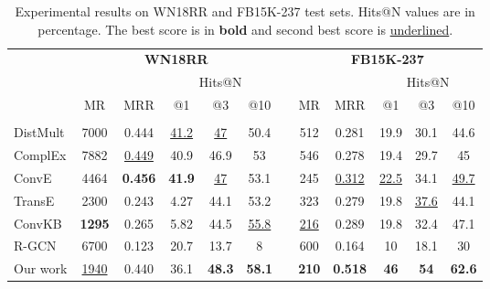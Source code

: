 \documentclass[11pt,a4paper]{article}
\begin{document}
\begin{table*}[t!]
	\centering\small
	\setlength{\tabcolsep}{4pt} \renewcommand{\arraystretch}{1} \begin{tabular}{lccccclccccc}
		\hline
		& \multicolumn{5}{c}{\textbf{WN18RR}} &  & \multicolumn{5}{c}{\textbf{FB15K-237}}         \\ \cline{2-6} \cline{8-12} 
		
		&  &  & \multicolumn{3}{c}{Hits@N} &  &  &  & \multicolumn{3}{c}{Hits@N} \\ \cline{4-6} \cline{10-12} 
		
		& MR & MRR & @1 & @3 & @10 &    & MR & MRR & @1 & @3 & @10    \\
		\hline
		\\
		DistMult \cite{yang2014} & 7000 & 0.444 & \underline{41.2} & \underline{47} & 50.4 &    & 512 & 0.281 & 19.9 & 30.1 & 44.6  \\
		
		ComplEx \cite{trouillon2016complex} & 7882 & \underline{0.449} & 40.9 & 46.9 & 53 &    & 546 & 0.278 & 19.4 & 29.7 & 45 \\
		
		ConvE \cite{dettmers2018convolutional} & 4464 & \textbf{0.456} & \textbf{41.9} & \underline{47} & 53.1 &    & 245 & \underline{0.312} & \underline{22.5} & 34.1 & \underline{49.7} \\
		
		TransE \cite{NIPS2013_5071} & 2300 & 0.243 & 4.27 & 44.1 & 53.2 &    & 323 & 0.279 & 19.8     & \underline{37.6} & 44.1    \\
		
		ConvKB \cite{nguyen2018novel} & \textbf{1295} & 0.265 & 5.82 & 44.5 & \underline{55.8} &    & \underline{216} & 0.289 & 19.8 & 32.4 & 47.1   \\
		
		R-GCN \cite{schlichtkrull2018modeling} & 6700 & 0.123 & 20.7 & 13.7 & 8 &    & 600 & 0.164 & 10 & 18.1 & 30 
		\\
		
		\hline
		Our work & \underline{1940} & 0.440 & 36.1 & \textbf{48.3} & \textbf{58.1} &    & \textbf{210} & \textbf{0.518} & \textbf{46} & \textbf{54} & \textbf{62.6}   \\
		
		\hline
	\end{tabular}
	\caption{Experimental results on WN18RR and FB15K-237 test sets. Hits@N values are in percentage. The best score is in \textbf{bold} and second best score is \underline{underlined}.
	}\label{tb:results1}
\end{table*}
\end{document}
